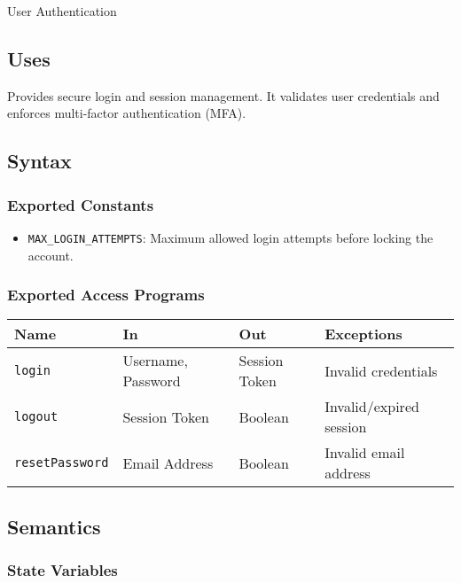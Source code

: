 \documentclass[12pt, titlepage]{article}
\begin{document}
User Authentication

\subsection{Uses}

Provides secure login and session management. It validates user credentials and enforces multi-factor authentication (MFA).

\subsection{Syntax}

\subsubsection{Exported Constants}
\begin{itemize}
    \item \texttt{MAX\_LOGIN\_ATTEMPTS}: Maximum allowed login attempts before locking the account.
\end{itemize}

\subsubsection{Exported Access Programs}

\begin{center}
\begin{tabular}{p{3cm} p{4cm} p{3cm} p{3.5cm}}
\hline
\textbf{Name} & \textbf{In} & \textbf{Out} & \textbf{Exceptions} \\
\hline
\texttt{login} & Username, Password & Session Token & Invalid credentials \\
\texttt{logout} & Session Token & Boolean & Invalid/expired session \\
\texttt{resetPassword} & Email Address & Boolean & Invalid email address \\
\hline
\end{tabular}
\end{center}

\subsection{Semantics}

\subsubsection{State Variables}
\end{document}
